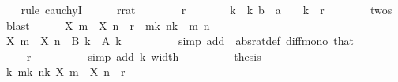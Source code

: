\begin{isabellebody}
\ \ \isamarkupfalse%
\ {\isacharparenleft}{\kern0pt}rule\ cauchyI{\isacharparenright}{\kern0pt}\isanewline
\ \ \ \ \isamarkupfalse%
\ r{\isacharcolon}{\kern0pt}{\isacharcolon}{\kern0pt}rat\isanewline
\ \ \ \ \isamarkupfalse%
\ {\isachardoublequoteopen}{}\ {\isacharless}{\kern0pt}\ r{\isachardoublequoteclose}\isanewline
\ \ \ \ \isamarkupfalse%
\ \isamarkupfalse%
\ k\ \ k{\isacharcolon}{\kern0pt}\ {\isachardoublequoteopen}{\isacharparenleft}{\kern0pt}b\ {\isacharminus}{\kern0pt}\ a{\isacharparenright}{\kern0pt}\ {\isacharslash}{\kern0pt}\ {}\ {\isacharcircum}{\kern0pt}\ k\ {\isacharless}{\kern0pt}\ r{\isachardoublequoteclose}\isanewline
\ \ \ \ \ \ \isamarkupfalse%
\ twos\ \isamarkupfalse%
\ blast\isanewline
\ \ \ \ \isamarkupfalse%
\ {\isachardoublequoteopen}{\isasymbar}X\ m\ {\isacharminus}{\kern0pt}\ X\ n{\isasymbar}\ {\isacharless}{\kern0pt}\ r{\isachardoublequoteclose}\ \ {\isachardoublequoteopen}m{\isasymge}k{\isachardoublequoteclose}\ {\isachardoublequoteopen}n{\isasymge}k{\isachardoublequoteclose}\ \ m\ n\isanewline
\ \ \ \ \isamarkupfalse%
\ {\isacharminus}{\kern0pt}\isanewline
\ \ \ \ \ \ \isamarkupfalse%
\ {\isachardoublequoteopen}{\isasymbar}X\ m\ {\isacharminus}{\kern0pt}\ X\ n{\isasymbar}\ {\isasymle}\ B\ k\ {\isacharminus}{\kern0pt}\ A\ k{\isachardoublequoteclose}\isanewline
\ \ \ \ \ \ \ \ \isamarkupfalse%
\ {\isacharparenleft}{\kern0pt}simp\ add{\isacharcolon}{\kern0pt}\ {\isacharasterisk}{\kern0pt}\ abs{\isacharunderscore}{\kern0pt}rat{\isacharunderscore}{\kern0pt}def\ diff{\isacharunderscore}{\kern0pt}mono\ that{\isacharparenright}{\kern0pt}\isanewline
\ \ \ \ \ \ \isamarkupfalse%
\ \isamarkupfalse%
\ {\isachardoublequoteopen}{\isachardot}{\kern0pt}{\isachardot}{\kern0pt}{\isachardot}{\kern0pt}\ {\isacharless}{\kern0pt}\ r{\isachardoublequoteclose}\isanewline
\ \ \ \ \ \ \ \ \isamarkupfalse%
\ {\isacharparenleft}{\kern0pt}simp\ add{\isacharcolon}{\kern0pt}\ k\ width{\isacharparenright}{\kern0pt}\isanewline
\ \ \ \ \ \ \isamarkupfalse%
\ \isamarkupfalse%
\ {\isacharquery}{\kern0pt}thesis\ \isacommand{{\isachardot}{\kern0pt}}\isamarkupfalse%
\isanewline
\ \ \ \ \isamarkupfalse%
\isanewline
\ \ \ \ \isamarkupfalse%
\ \isamarkupfalse%
\ {\isachardoublequoteopen}{\isasymexists}k{\isachardot}{\kern0pt}\ {\isasymforall}m{\isasymge}k{\isachardot}{\kern0pt}\ {\isasymforall}n{\isasymge}k{\isachardot}{\kern0pt}\ {\isasymbar}X\ m\ {\isacharminus}{\kern0pt}\ X\ n{\isasymbar}\ {\isacharless}{\kern0pt}\ r{\isachardoublequoteclose}\isanewline

\end{isabellebody}
